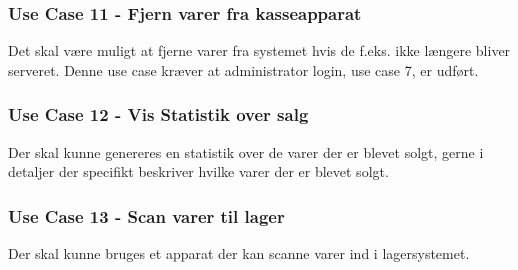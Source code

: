 \subsubsection*{Use Case 11 - Fjern varer fra kasseapparat}
Det skal være muligt at fjerne varer fra systemet hvis de f.eks. ikke længere bliver serveret. Denne use case kræver at administrator login, use case 7, er udført.

\subsubsection*{Use Case 12 - Vis Statistik over salg}
Der skal kunne genereres en statistik over de varer der er blevet solgt, gerne i detaljer der specifikt beskriver hvilke varer der er blevet solgt.

\subsubsection*{Use Case 13 - Scan varer til lager}
Der skal kunne bruges et apparat der kan scanne varer ind i lagersystemet. 